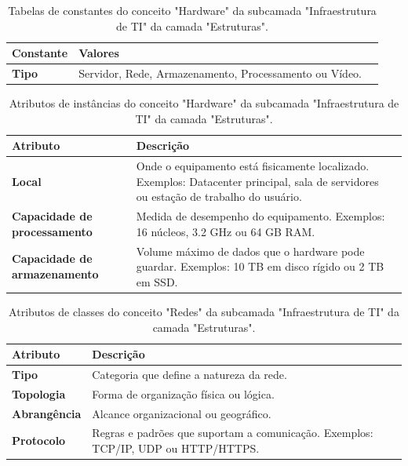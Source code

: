 \begin{apendicesenv}
\begin{table}[H]
\centering
\caption{Tabelas de constantes do conceito "Hardware" da subcamada "Infraestrutura de TI" da camada "Estruturas".}
\begin{tabularx}{\textwidth}{|l|X|X|}
\hline
\textbf{Constante} & \textbf{Valores} \\ \hline
\textbf{Tipo}  & Servidor, Rede, Armazenamento, Processamento ou Vídeo. \\ \hline
\end{tabularx}
\end{table}

\begin{table}[H]
\centering
\caption{Atributos de instâncias do conceito "Hardware" da subcamada "Infraestrutura de TI" da camada "Estruturas".}
\begin{tabularx}{\textwidth}{|l|X|X|}
\hline
\textbf{Atributo} & \textbf{Descrição} \\ \hline
\textbf{Local} & Onde o equipamento está fisicamente localizado. Exemplos: Datacenter principal, sala de servidores ou estação de trabalho do usuário. \\ \hline
\textbf{Capacidade de processamento}  & Medida de desempenho do equipamento. Exemplos: 16 núcleos, 3.2 GHz ou 64 GB RAM. \\ \hline
\textbf{Capacidade de armazenamento} & Volume máximo de dados que o hardware pode guardar. Exemplos: 10 TB em disco rígido ou 2 TB em SSD. \\ \hline
\end{tabularx}
\end{table}

\begin{table}[H]
\centering
\caption{Atributos de classes do conceito "Redes" da subcamada "Infraestrutura de TI" da camada "Estruturas".}
\begin{tabularx}{\textwidth}{|l|X|X|}
\hline
\textbf{Atributo} & \textbf{Descrição} \\ \hline
\textbf{Tipo}  & Categoria que define a natureza da rede. \\ \hline
\textbf{Topologia} & Forma de organização física ou lógica. \\ \hline
\textbf{Abrangência} & Alcance organizacional ou geográfico. \\ \hline
\textbf{Protocolo} & Regras e padrões que suportam a comunicação. Exemplos: TCP/IP, UDP ou HTTP/HTTPS. \\ \hline
\end{tabularx}
\end{table}


\end{apendicesenv}
